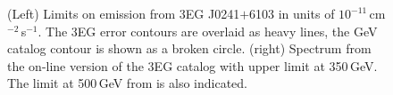 \begin{figure}[t]
\caption{\label{FIG::OBSERVATIONS::J0241} (Left) Limits on emission from 
3EG J0241$+$6103 in units of $10^{-11}$\,cm$^{-2}$\,s$^{-1}$. The 3EG
error contours are overlaid as heavy lines, the GeV catalog contour is
shown as a broken circle. (right) Spectrum from the on-line version of the 3EG
catalog with upper limit at 350\,GeV. The limit at 500\,GeV from 
\citet{REF::HALL::APJ2003} is also indicated.}
\end{figure}

